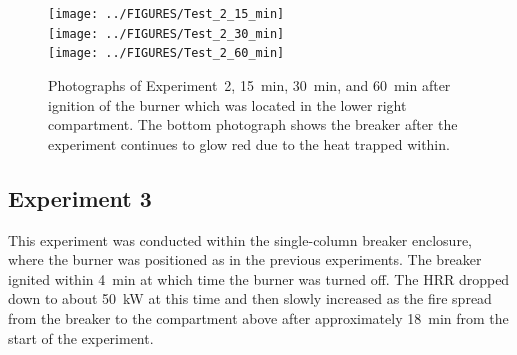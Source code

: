 \documentclass[12pt]{article}
\begin{document}
\begin{figure}[p]
\centering
\texttt{[image: ../FIGURES/Test\_2\_15\_min]} \\
\texttt{[image: ../FIGURES/Test\_2\_30\_min]} \\
\texttt{[image: ../FIGURES/Test\_2\_60\_min]}
\caption[Photographs of Experiment~2]{Photographs of Experiment~2, 15~min, 30~min, and 60~min after ignition of the burner which was located in the lower right compartment. The bottom photograph shows the breaker after the experiment continues to glow red due to the heat trapped within.}
\label{fig:Test_2_photos}
\end{figure}


\clearpage

\subsection{Experiment 3}

This experiment was conducted within the single-column breaker enclosure, where the burner was positioned as in the previous experiments. The breaker ignited within 4~min at which time the burner was turned off. The HRR dropped down to about 50~kW at this time and then slowly increased as the fire spread from the breaker to the compartment above after approximately 18~min from the start of the experiment.
\end{document}

